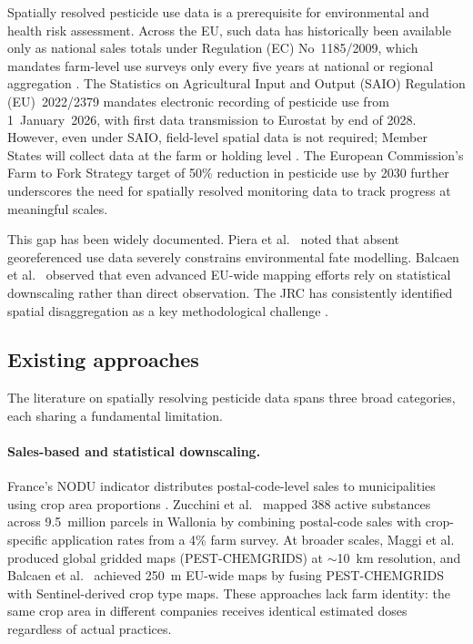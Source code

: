 \documentclass[12pt,a4paper]{article}
\begin{document}
Spatially resolved pesticide use data is a prerequisite for environmental and health risk assessment. Across the EU, such data has historically been available only as national sales totals under Regulation (EC) No~1185/2009, which mandates farm-level use surveys only every five years at national or regional aggregation \cite{eurostat2023}. The Statistics on Agricultural Input and Output (SAIO) Regulation (EU)~2022/2379 mandates electronic recording of pesticide use from 1~January~2026, with first data transmission to Eurostat by end of 2028. However, even under SAIO, field-level spatial data is not required; Member States will collect data at the farm or holding level \cite{ec2022}. The European Commission's Farm to Fork Strategy target of 50\% reduction in pesticide use by 2030 \cite{ec2020} further underscores the need for spatially resolved monitoring data to track progress at meaningful scales.

This gap has been widely documented. Piera et al.\ \cite{piera2023} noted that absent georeferenced use data severely constrains environmental fate modelling. Balcaen et al.\ \cite{balcaen2025} observed that even advanced EU-wide mapping efforts rely on statistical downscaling rather than direct observation. The JRC has consistently identified spatial disaggregation as a key methodological challenge \cite{jrc2019}.

\subsection{Existing approaches}

The literature on spatially resolving pesticide data spans three broad categories, each sharing a fundamental limitation.

\paragraph{Sales-based and statistical downscaling.} France's NODU indicator distributes postal-code-level sales to municipalities using crop area proportions \cite{deguine2023}. Zucchini et al.\ \cite{zucchini2022} mapped 388 active substances across 9.5~million parcels in Wallonia by combining postal-code sales with crop-specific application rates from a 4\% farm survey. At broader scales, Maggi et al.\ \cite{maggi2019} produced global gridded maps (PEST-CHEMGRIDS) at $\sim$10~km resolution, and Balcaen et al.\ \cite{balcaen2025} achieved 250~m EU-wide maps by fusing PEST-CHEMGRIDS with Sentinel-derived crop type maps. These approaches lack farm identity: the same crop area in different companies receives identical estimated doses regardless of actual practices.
\end{document}
